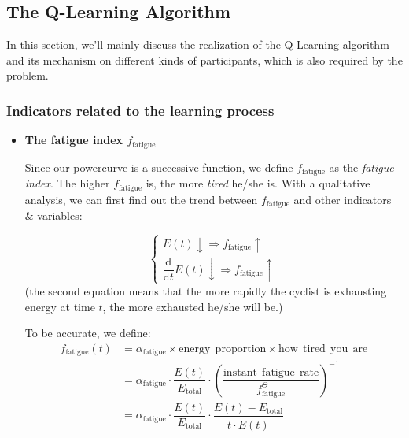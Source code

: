 \documentclass{article}
\begin{document}
		\subsection{The Q-Learning Algorithm}
			In this section, we'll mainly discuss the realization of the Q-Learning algorithm and its mechanism on different kinds of participants, which is also required by the problem.

			\subsubsection{Indicators related to the learning process}
				\begin{itemize}
					\item \textbf{The fatigue index \(f_{\mathrm{fatigue}}\)}

						Since our powercurve is a successive function, we define \(f_{\mathrm{fatigue}}\) as the \textit{fatigue index}. The higher \(f_{\mathrm{fatigue}}\) is, the more \textit{tired} he/she is. With a qualitative analysis, we can first find out the trend between \(f_{\mathrm{fatigue}}\) and other indicators \& variables:

						\[
							\begin{cases}
								E(t)\downarrow\Rightarrow f_{\mathrm{fatigue}}\uparrow \\
								\dfrac{\mathrm{d}}{\mathrm{d}t}E(t)\downarrow\Rightarrow f_{\mathrm{fatigue}}\uparrow
							\end{cases}
						\]
						(the second equation means that the more rapidly the cyclist is exhausting energy at time \(t\), the more exhausted he/she will be.)

						To be accurate, we define:
						\[
							\begin{aligned}
								f_{\mathrm{fatigue}}\left( t \right) &=\alpha _{\mathrm{fatigue}}\times \mathrm{energy}\:\:\mathrm{proportion}\times \mathrm{how}\:\:\mathrm{tired}\:\:\mathrm{you}\:\:\mathrm{are}
								\\
								&=\alpha _{\mathrm{fatigue}}\cdot \dfrac{E\left( t \right)}{E_{\mathrm{total}}}\cdot \left( \dfrac{\mathrm{instant}\:\:\mathrm{fatigue}\:\:\mathrm{rate}}{f_{\mathrm{fatigue}}^{\Theta}} \right) ^{-1}
								\\
								&=\alpha _{\mathrm{fatigue}}\cdot \dfrac{E\left( t \right)}{E_{\mathrm{total}}}\cdot \dfrac{E\left( t \right) -E_{\mathrm{total}}}{t\cdot \dot{E}\left( t \right)}
							\end{aligned}
						\]


\end{itemize}
\end{document}
